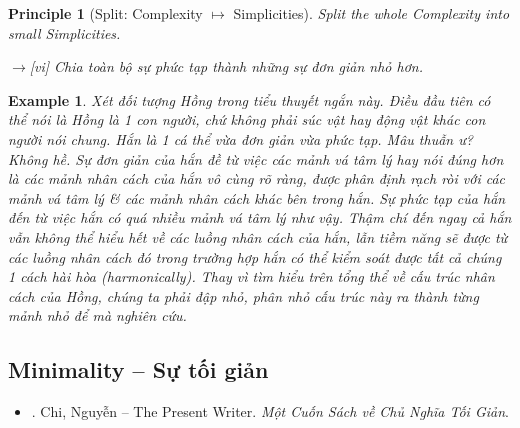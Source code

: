 \documentclass[12pt,twoside]{book}
\newtheorem{example}{Example}
\newtheorem{principle}{Principle}
\begin{document}
\begin{principle}[Split: Complexity $\mapsto$ Simplicities]
	Split the whole Complexity into small Simplicities.
	
	{\sf[en]$\to$[vi]} Chia toàn bộ sự phức tạp thành những sự đơn giản nhỏ hơn.
\end{principle}

\begin{example}
	Xét đối tượng {\sf Hồng} trong tiểu thuyết ngắn này. Điều đầu tiên có thể nói là {\sf Hồng} là 1 con người, chứ không phải súc vật hay động vật khác con người nói chung. Hắn là 1 cá thể vừa đơn giản vừa phức tạp. Mâu thuẫn ư? Không hề. Sự đơn giản của hắn đề từ việc các mảnh vá tâm lý hay nói đúng hơn là các mảnh nhân cách của hắn vô cùng rõ ràng, được phân định rạch ròi với các mảnh vá tâm lý \& các mảnh nhân cách khác bên trong hắn. Sự phức tạp của hắn đến từ việc hắn có quá nhiều mảnh vá tâm lý như vậy. Thậm chí đến ngay cả hắn vẫn không thể hiểu hết về các luồng nhân cách của hắn, lẫn tiềm năng sẽ được từ các luồng nhân cách đó trong trường hợp hắn có thể kiểm soát được tất cả chúng 1 cách hài hòa (harmonically). Thay vì tìm hiểu trên tổng thể về cấu trúc nhân cách của {\sf Hồng}, chúng ta phải đập nhỏ, phân nhỏ cấu trúc này ra thành từng mảnh nhỏ để mà nghiên cứu.
\end{example}

\subsection{Minimality -- Sự tối giản}
\begin{itemize}
	\item \cite{Chi2022}. {\sc Chi, Nguyễn -- The Present Writer}. {\it Một Cuốn Sách về Chủ Nghĩa Tối Giản}.
\end{itemize}
\end{document}
